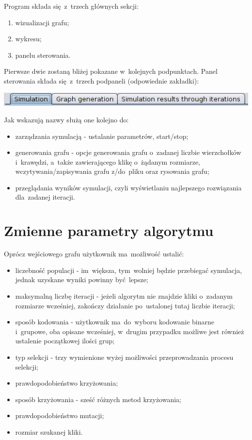 \documentclass[11pt]{aghdpl}
\begin{document}
Program składa się~z~trzech głównych sekcji:
\begin{enumerate}[noitemsep]
 \item wizualizacji grafu;
 \item wykresu;
 \item panelu sterowania.
\end{enumerate}

Pierwsze dwie zostaną bliżej pokazane w~kolejnych podpunktach. Panel sterowania składa się~z~trzech podpaneli (odpowiednie zakładki):

\includegraphics[width=14cm]{zakladki}

Jak wskazują nazwy służą one kolejno do:
\begin{itemize}[noitemsep]
 \item zarządzania symulacją - ustalanie parametrów, start/stop;
 \item generowania grafu - opcje generowania grafu o~zadanej liczbie wierzchołków i~krawędzi, a~także zawierającego klikę o~żądanym rozmiarze,
 wczytywania/zapisywania grafu z/do~pliku oraz rysowania grafu;
 \item przeglądania wyników symulacji, czyli wyświetlaniu najlepszego rozwiązania dla~zadanej iteracji.
\end{itemize}

\section{Zmienne parametry algorytmu}
\label{sec:params}
Oprócz wejściowego grafu użytkownik ma~możliwość ustalić:
\begin{itemize}[noitemsep]
 \item liczebność populacji - im~większa, tym~wolniej będzie przebiegać symulacja, jednak uzyskane wyniki powinny być~lepsze;
 \item maksymalną liczbę iteracji - jeżeli algorytm nie znajdzie kliki o~zadanym rozmiarze wcześniej, zakończy działanie po~ustalonej tutaj liczbie iteracji;
 \item sposób kodowania - użytkownik ma~do~wyboru kodowanie binarne i~grupowe, oba opisane wcześniej, w~drugim przypadku możliwe jest również ustalenie 
początkowej ilości grup;
 \item typ selekcji - trzy wymienione wyżej możliwości przeprowadzania procesu selekcji;
 \item prawdopodobieństwo krzyżowania;
 \item sposób krzyżowania - sześć różnych metod krzyżowania;
 \item prawdopodobieństwo mutacji;
 \item rozmiar szukanej kliki.
\end{itemize}
\end{document}
